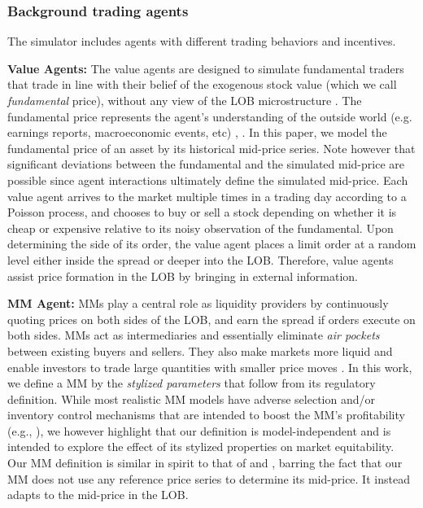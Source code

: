 \documentclass[sigconf]{acmart}
\begin{document}
\subsubsection{Background trading agents\label{subsubsec:market_participants}}

The simulator includes agents with different trading behaviors and incentives.

{\bf Value Agents:} 
The value agents are designed to simulate fundamental traders that trade in line with their belief of the exogenous stock value (which we call {\it fundamental} price), without any view of the LOB microstructure \cite{kyle1985continuous}. The fundamental price represents the agent's understanding of the outside world (e.g. earnings reports, macroeconomic events, etc) \cite{wang2017spoofing}, \cite{wah2017welfare}. In this paper, we model the fundamental price of an asset by its historical mid-price series. Note however that significant deviations between the fundamental and the simulated mid-price are possible since agent interactions ultimately define the simulated mid-price. Each value agent arrives to the market multiple times in a trading day according to a Poisson process, and chooses to buy or sell a stock depending on whether it is cheap or expensive relative to its noisy observation of the fundamental. Upon determining the side of its order, the value agent places a limit order at a random level either inside the spread or deeper into the LOB. Therefore, value agents assist price formation in the LOB by bringing in external information. 

{\bf MM Agent:} MMs play a central role as liquidity providers by continuously quoting prices on both sides of the LOB, and earn the spread if orders execute on both sides. MMs act as intermediaries and essentially eliminate \textit{air pockets} between existing buyers and sellers. They also make markets more liquid and enable investors to trade large quantities with smaller price moves \cite{high_freq_fairness}. In this work, we define a MM by the {\it{stylized parameters}} that follow from its regulatory definition. While most realistic MM models have adverse selection and/or inventory control mechanisms that are intended to boost the MM's profitability (e.g., \cite{AvellanedaStoikov}), we however highlight that our definition is model-independent and is intended to explore the effect of its stylized properties on market equitability. Our MM definition is similar in spirit to that of \cite{wah2017welfare} and \cite{chakraborty2011market}, barring the fact that our MM does not use any reference price series to determine its mid-price. It instead adapts to the mid-price in the LOB.
\end{document}
